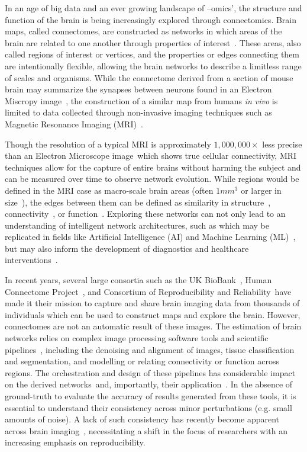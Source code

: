 In an age of big data and an ever growing landscape of –omics', the structure and function of the brain is being
increasingly explored through connectomics. Brain maps, called connectomes, are constructed as networks in which areas
of the brain are related to one another through properties of interest~\tocite. These areas, also called regions of
interest or vertices, and the properties or edges connecting them are intentionally flexible, allowing the brain
networks to describe a limitless range of scales and organisms. While the connectome derived from a section of mouse
brain may summarize the synapses between neurons found in an Electron Miscropy image~\tocite, the construction of a
similar map from humans \textit{in vivo} is limited to data collected through non-invasive imaging techniques such as
Magnetic Resonance Imaging (MRI)~\tocite.

Though the resolution of a typical MRI is approximately $1,000,000 \times$ less precise than an Electron Microscope
image~\tocite which shows true cellular connectivity, MRI techniques allow for the capture of entire brains without
harming the subject and can be measured over time to observe network evolution. While regions would be defined in the
MRI case as macro-scale brain areas (often $1mm^3$ or larger in size~\tocite), the edges between them can be defined as
similarity in structure~\tocite, connectivity~\tocite, or function~\tocite. Exploring these networks can not only lead
to an understanding of intelligent network architectures, such as which may be replicated in fields like Artificial
Intelligence (AI) and Machine Learning (ML)~\tocite, but may also inform the development of diagnostics and healthcare
interventions~\tocite.

In recent years, several large consortia such as the UK BioBank~\tocite, Human Connectome Project~\tocite, and
Consortium of Reproducibility and Reliability~\tocite have made it their mission to capture and share brain imaging
data from thousands of individuals which can be used to construct maps and explore the brain. However, connectomes are
not an automatic result of these images. The estimation of brain networks relies on complex image processing software
tools and scientific pipelines~\tocite, including the denoising and alignment of images, tissue classification and
segmentation, and modelling or relating connectivity or function across regions. The orchestration and design of these
pipelines has considerable impact on the derived networks~\tocite and, importantly, their application~\tocite. In the
absence of ground-truth to evaluate the accuracy of results generated from these tools, it is essential to understand
their consistency across minor perturbations (e.g. small amounts of noise). A lack of such consistency has recently
become apparent across brain imaging~\tocite, necessitating a shift in the focus of researchers with an increasing
emphasis on reproducibility.

